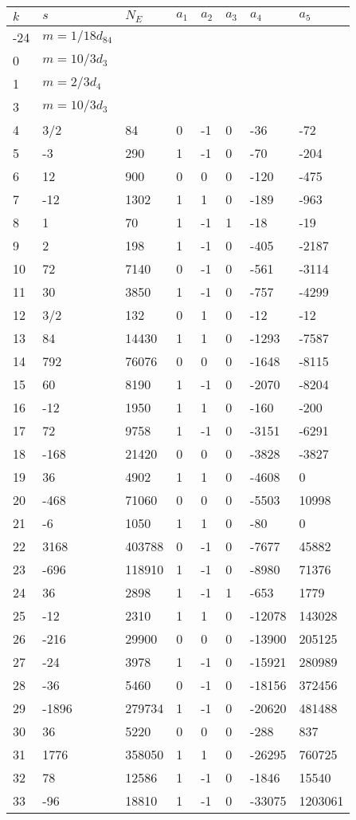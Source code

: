 \documentclass{amsart}
\begin{document}
\begin{longtable}{|l|l|l|lllll|}
\hline
$k$ & $s$ & $N_E$ & $a_1$ & $a_2$ & $a_3$ & $a_4$ & $a_5$\\
\hline
-24&$m=1/18d_{84}$&&\multicolumn{5}{c|}{}\\
0&$m=10/3d_{3}$&&\multicolumn{5}{c|}{}\\
1&$m=2/3d_{4}$&&\multicolumn{5}{c|}{}\\
3&$m=10/3d_{3}$&&\multicolumn{5}{c|}{}\\
4&3/2&84&0&-1&0&-36&-72\\
5&-3&290&1&-1&0&-70&-204\\
6&12&900&0&0&0&-120&-475\\
7&-12&1302&1&1&0&-189&-963\\
8&1&70&1&-1&1&-18&-19\\
9&2&198&1&-1&0&-405&-2187\\
10&72&7140&0&-1&0&-561&-3114\\
11&30&3850&1&-1&0&-757&-4299\\
12&3/2&132&0&1&0&-12&-12\\
13&84&14430&1&1&0&-1293&-7587\\
14&792&76076&0&0&0&-1648&-8115\\
15&60&8190&1&-1&0&-2070&-8204\\
16&-12&1950&1&1&0&-160&-200\\
17&72&9758&1&-1&0&-3151&-6291\\
18&-168&21420&0&0&0&-3828&-3827\\
19&36&4902&1&1&0&-4608&0\\
20&-468&71060&0&0&0&-5503&10998\\
21&-6&1050&1&1&0&-80&0\\
22&3168&403788&0&-1&0&-7677&45882\\
23&-696&118910&1&-1&0&-8980&71376\\
24&36&2898&1&-1&1&-653&1779\\
25&-12&2310&1&1&0&-12078&143028\\
26&-216&29900&0&0&0&-13900&205125\\
27&-24&3978&1&-1&0&-15921&280989\\
28&-36&5460&0&-1&0&-18156&372456\\
29&-1896&279734&1&-1&0&-20620&481488\\
30&36&5220&0&0&0&-288&837\\
31&1776&358050&1&1&0&-26295&760725\\
32&78&12586&1&-1&0&-1846&15540\\
33&-96&18810&1&-1&0&-33075&1203061\\

\end{longtable}
\end{document}
